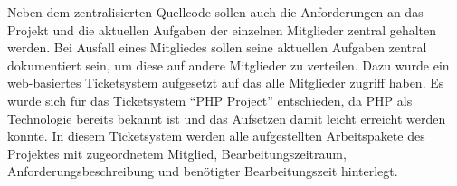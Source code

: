 
Neben dem zentralisierten Quellcode sollen auch die Anforderungen an das Projekt und die aktuellen Aufgaben der einzelnen Mitglieder zentral gehalten werden. Bei Ausfall eines Mitgliedes sollen seine aktuellen Aufgaben zentral dokumentiert sein, um diese auf andere Mitglieder zu verteilen. Dazu wurde ein web-basiertes Ticketsystem aufgesetzt auf das alle Mitglieder zugriff haben. Es wurde sich für das Ticketsystem "`PHP Project"' entschieden, da PHP als Technologie bereits bekannt ist und das Aufsetzen damit leicht erreicht werden konnte. In diesem Ticketsystem werden alle aufgestellten Arbeitspakete des Projektes mit zugeordnetem Mitglied, Bearbeitungszeitraum, Anforderungsbeschreibung und benötigter Bearbeitungszeit hinterlegt.